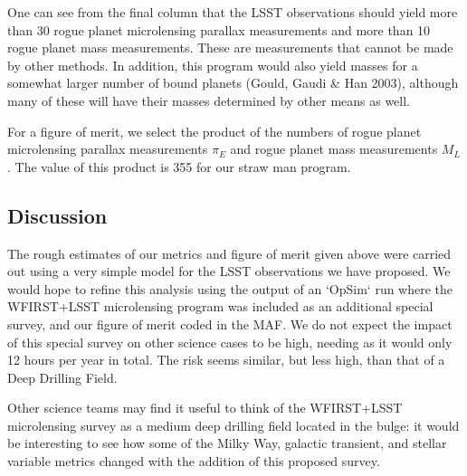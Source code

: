 One can see from the final column that the LSST observations should
yield more than 30 rogue planet microlensing parallax measurements and
more than 10 rogue planet mass measurements.
%
These are measurements that cannot be made by other methods.
%
In addition, this program would
also yield masses for a somewhat larger number of bound planets
(Gould, Gaudi \& Han 2003), although many of these will have their
masses determined by other means as well.

For a figure of merit, we select the product of the numbers of
rogue planet microlensing parallax measurements $\pi_E$
and rogue planet mass measurements $M_L$.
The value of this product is 355 for our straw man program.


%
%
%
%

\subsection{Discussion}
\label{sec:\secname:discussion}

The rough estimates of our metrics and figure of merit given above were
carried out using a very simple model for the LSST observations we
have proposed. We would hope to refine this analysis using the output
of an `OpSim` run where the WFIRST+LSST microlensing program was included
as an additional special survey, and our figure of merit coded in the
MAF. We do not expect the impact of this special survey on other science cases
to be high, needing as it would only 12 hours per year in total. The risk
seems similar, but less high, than that of a Deep Drilling Field.

Other science teams may find it useful to think of the WFIRST+LSST microlensing
survey as a medium deep drilling field located in the bulge: it would be interesting
to see how some of the Milky Way, galactic transient, and  stellar variable
metrics changed with the addition of this proposed survey.



\navigationbar

